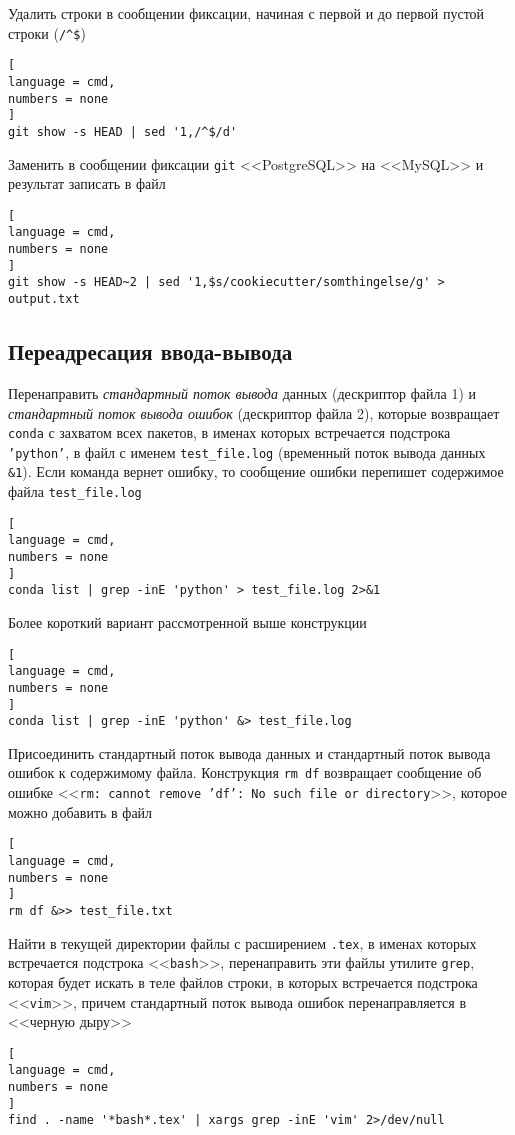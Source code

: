 \documentclass[%
	11pt,
	a4paper,
	utf8,
		]{article}
\begin{document}
Удалить строки в сообщении фиксации, начиная с первой и до первой пустой строки (\verb|/^$|)
\begin{lstlisting}[
language = cmd,
numbers = none
]
git show -s HEAD | sed '1,/^$/d'
\end{lstlisting}

Заменить в сообщении фиксации \texttt{git} <<PostgreSQL>> на <<MySQL>> и результат записать в файл
\begin{lstlisting}[
language = cmd,
numbers = none
]
git show -s HEAD~2 | sed '1,$s/cookiecutter/somthingelse/g' > output.txt
\end{lstlisting}




\subsection{Переадресация ввода-вывода}

Перенаправить \emph{стандартный поток вывода} данных (дескриптор файла 1) и \emph{стандартный поток вывода ошибок} (дескриптор файла 2), которые возвращает \texttt{conda} с захватом всех пакетов, в именах которых встречается подстрока \texttt{'python'}, в файл с именем \texttt{test\_file.log} (временный поток вывода данных \texttt{\&1}). Если команда вернет ошибку, то сообщение ошибки перепишет содержимое файла \texttt{test\_file.log}
\begin{lstlisting}[
language = cmd,
numbers = none
]
conda list | grep -inE 'python' > test_file.log 2>&1
\end{lstlisting}

Более короткий вариант рассмотренной выше конструкции
\begin{lstlisting}[
language = cmd,
numbers = none
]
conda list | grep -inE 'python' &> test_file.log
\end{lstlisting}

Присоединить стандартный поток вывода данных и стандартный поток вывода ошибок к содержимому файла. Конструкция \texttt{rm df} возвращает сообщение об ошибке <<\texttt{rm: cannot remove 'df': No such file or directory}>>, которое можно добавить в файл
\begin{lstlisting}[
language = cmd,
numbers = none
]
rm df &>> test_file.txt
\end{lstlisting}

Найти в текущей директории файлы с расширением \texttt{.tex}, в именах которых встречается подстрока <<\texttt{bash}>>, перенаправить эти файлы утилите \texttt{grep}, которая будет искать в теле файлов строки, в которых встречается подстрока <<\texttt{vim}>>, причем стандартный поток вывода ошибок перенаправляется в <<черную дыру>>
\begin{lstlisting}[
language = cmd,
numbers = none
]
find . -name '*bash*.tex' | xargs grep -inE 'vim' 2>/dev/null
\end{lstlisting}
\end{document}
